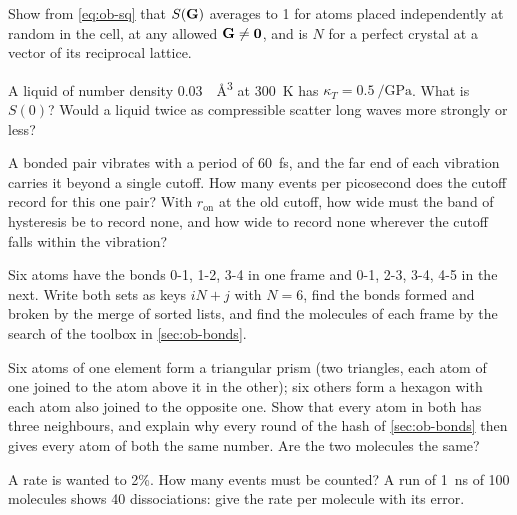 \begin{exercise}
\label{ex:ob-sq-limits}
Show from \cref{eq:ob-sq} that $S(\bm{\mathrm{G}})$ averages to 1 for atoms placed
independently at random in the cell, at any allowed $\bm{\mathrm{G}} \neq
\bm{\mathrm{0}}$, and is $N$ for a perfect crystal at a vector of its reciprocal
lattice.
\end{exercise}

\begin{exercise}
\label{ex:ob-s0}
A liquid of number density \SI{0.03}{\per\angstrom\cubed} at
\SI{300}{\kelvin} has $\kappa_T = \SI{0.5}{\per\giga\pascal}$. What is
$S(0)$? Would a liquid twice as compressible scatter long waves more
strongly or less?
\end{exercise}

\begin{exercise}[flicker]
\label{ex:ob-flicker}
A bonded pair vibrates with a period of \SI{60}{\femto\second}, and the
far end of each vibration carries it beyond a single cutoff. How many
events per picosecond does the cutoff record for this one pair? With
$r_{\mathrm{on}}$ at the old cutoff, how wide must the band of hysteresis
be to record none, and how wide to record none wherever the cutoff falls
within the vibration?
\end{exercise}

\begin{exercise}
\label{ex:ob-keys}
Six atoms have the bonds 0-1, 1-2, 3-4 in one frame and 0-1, 2-3, 3-4,
4-5 in the next. Write both sets as keys $iN + j$ with $N = 6$, find the
bonds formed and broken by the merge of sorted lists, and find the
molecules of each frame by the search of the toolbox in \cref{sec:ob-bonds}.
\end{exercise}

\begin{exercise}
\label{ex:ob-hash}
Six atoms of one element form a triangular prism (two triangles, each
atom of one joined to the atom above it in the other); six others form
a hexagon with each atom also joined to the opposite one. Show that every
atom in both has three neighbours, and explain why every round of the
hash of \cref{sec:ob-bonds} then gives every atom of both the same
number. Are the two molecules the same?
\end{exercise}

\begin{exercise}
\label{ex:ob-poisson}
A rate is wanted to 2\%. How many events must be counted? A run of
\SI{1}{\nano\second} of 100 molecules shows 40 dissociations: give the
rate per molecule with its error.
\end{exercise}

